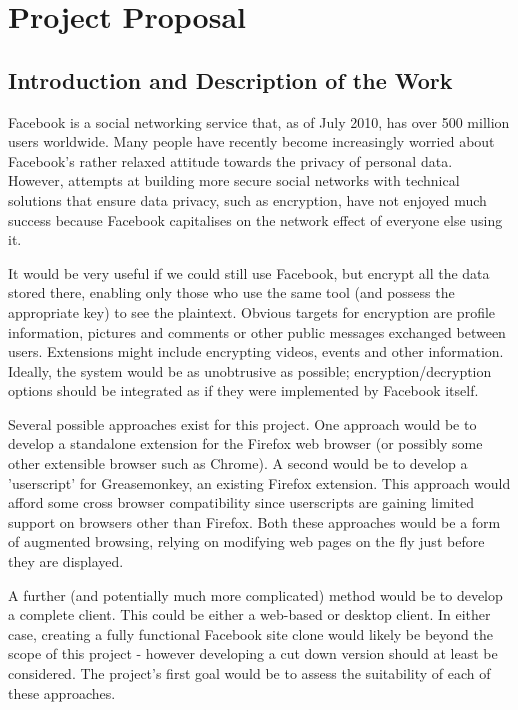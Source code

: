 \chapter{Project Proposal}

\section*{Introduction and Description of the Work}

Facebook is a social networking service that, as of July 2010, has over 500 million users worldwide. Many people have recently become increasingly worried about Facebook's rather relaxed attitude towards the privacy of personal data. However, attempts at building more secure social networks with technical solutions that ensure data privacy, such as encryption, have not enjoyed much success because Facebook capitalises on the network effect of everyone else using it.

It would be very useful if we could still use Facebook, but encrypt all the data stored there, enabling only those who use the same tool (and possess the appropriate key) to see the plaintext. Obvious targets for encryption are profile information, pictures and comments or other public messages exchanged between users. Extensions might include encrypting videos, events and other information. Ideally, the system would be as unobtrusive as possible; encryption/decryption options should be integrated as if they were implemented by Facebook itself.

Several possible approaches exist for this project. One approach would be to develop a standalone extension for the Firefox web browser (or possibly some other extensible browser such as Chrome). A second would be to develop a 'userscript' for Greasemonkey, an existing Firefox extension. This approach would afford some cross browser compatibility since userscripts are gaining limited support on browsers other than Firefox. Both these approaches would be a form of augmented browsing, relying on modifying web pages on the fly just before they are displayed.

A further (and potentially much more complicated) method would be to develop a complete client. This could be either a web-based or desktop client. In either case, creating a fully functional Facebook site clone would likely be beyond the scope of this project - however developing a cut down version should at least be considered. The project's first goal would be to assess the suitability of each of these approaches.



